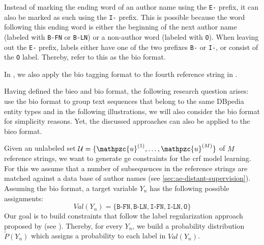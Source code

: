 Instead of marking the ending word of an author name using the \texttt{E-} prefix, it can also be marked as such using the \texttt{I-} prefix.
This is possible because the word following this ending word is either the beginning of the next author name (labeled with \texttt{B-FN} or \texttt{B-LN}) or a non-author word (labeled with \texttt{O}).
When leaving out the \texttt{E-} prefix, labels either have one of the two prefixes \texttt{B-} or \texttt{I-}, or consist of the \texttt{O} label.
Thereby, \citet{houngbo2012method} refer to this as the \gls{bio} format.

In , we also apply the \gls{bio} tagging format to the fourth reference string in .

\bigskip

Having defined the \gls{bieo} and \gls{bio} format, the following research question arises:
\newcommand\researchquestiontwo{}
\researchquestiontwo%
\citet{lu2013web} use the \gls{bio} format to group text sequences that belong to the same DBpedia entity types and in the following illustrations, we will also consider the \gls{bio} format for simplicity reasons.
Yet, the discussed approaches can also be applied to the \gls{bieo} format.

\bigskip

Given an unlabeled set $\mathcal{U}=\{\mathpzc{u}^{(1)},\dots,\mathpzc{u}^{(M)}\}$ of $M$ reference strings, we want to generate \gls{ge} constraints for the \gls{crf} model learning.
For this we assume that a number of subsequences in the reference strings are matched against a data base of author names (see \cref{sec:ae-distant-supervision}).
Assuming the \gls{bio} format, a \gls{target variable} $Y_n$ has the following possible assignments:
\begin{equation*}
  \mathit{Val}(Y_n)=\{\texttt{B-FN},\texttt{B-LN},\texttt{I-FN},\texttt{I-LN},\texttt{O}\}
\end{equation*}
Our goal is to build constraints that follow the \gls{label regularization} approach proposed by \citet{mann2010generalized} (see ).
Thereby, for every $Y_n$, we build a \gls{probability distribution} $\tilde{P}(Y_n)$ which assigns a probability to each label in $\mathit{Val}(Y_n)$.

